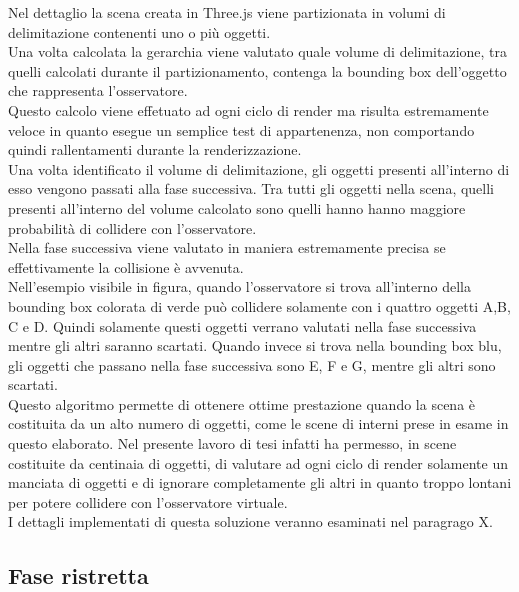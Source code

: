 Nel dettaglio la scena creata in Three.js viene partizionata in volumi di delimitazione contenenti uno o più oggetti.
\\
Una volta calcolata la gerarchia viene valutato quale volume di delimitazione, tra quelli calcolati durante il partizionamento, contenga la  bounding box dell’oggetto che rappresenta l’osservatore.
\\
Questo calcolo viene effetuato ad ogni ciclo di render ma risulta estremamente veloce in quanto esegue un semplice test di appartenenza, non comportando quindi rallentamenti durante la renderizzazione.
\\
Una volta identificato il volume di delimitazione, gli oggetti presenti all’interno di esso vengono passati alla fase successiva. Tra tutti gli oggetti nella scena, quelli presenti all’interno del volume calcolato sono quelli hanno hanno maggiore probabilità di collidere con l’osservatore.
\\
Nella fase successiva viene valutato in maniera estremamente precisa se effettivamente la collisione è avvenuta.
\\
Nell’esempio visibile in figura, quando l’osservatore si trova all’interno della bounding box colorata di verde può collidere solamente con i quattro oggetti A,B, C e D. Quindi solamente questi oggetti verrano valutati nella fase successiva mentre gli altri saranno scartati.
Quando invece si trova nella bounding box blu, gli oggetti che passano nella fase successiva sono E, F e G, mentre gli altri sono scartati.
\\
Questo algoritmo permette di ottenere ottime prestazione quando la scena è costituita da un alto numero di oggetti, come le scene di interni prese in esame in questo elaborato.
Nel presente lavoro di tesi infatti ha permesso, in scene costituite da centinaia di oggetti, di valutare ad ogni ciclo di render solamente un manciata di oggetti e di ignorare completamente gli altri in quanto troppo lontani per potere collidere con l’osservatore virtuale.
\\
I dettagli implementati di questa soluzione veranno esaminati nel paragrago X.

\subsection{Fase ristretta}


